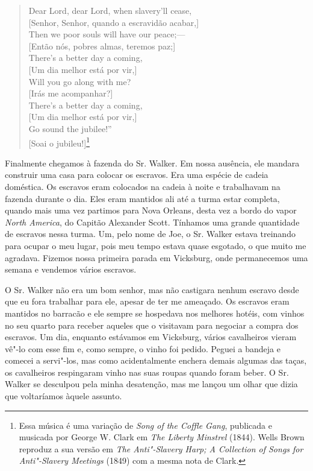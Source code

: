 \begin{verse}
Dear Lord, dear Lord, when slavery'll cease,\\
{[}Senhor, Senhor, quando a escravidão acabar,{]}\\
Then we poor souls will have our peace;---\\
{[}Então nós, pobres almas, teremos paz;{]}\\
There's a better day a coming,\\
{[}Um dia melhor está por vir,{]}\\
Will you go along with me?\\
{[}Irás me acompanhar?{]}\\
There's a better day a coming,\\
{[}Um dia melhor está por vir,{]}\\
Go sound the jubilee!''\\
{[}Soai o jubileu!{]}\footnote{Essa música é uma
  variação de \emph{Song of the Coffle Gang}, publicada e musicada por
  George W. Clark em \emph{The Liberty Minstrel} (1844). Wells Brown
  reproduz a sua versão em \emph{The Anti"-Slavery Harp; A Collection of
  Songs for Anti"-Slavery Meetings} (1849) com a mesma nota de Clark.}
\end{verse}

Finalmente chegamos à fazenda do Sr. Walker. Em nossa ausência, ele
mandara construir uma casa para colocar os escravos. Era uma espécie de
cadeia doméstica. Os escravos eram colocados na cadeia à noite e
trabalhavam na fazenda durante o dia. Eles eram mantidos ali até a turma
estar completa, quando mais uma vez partimos para Nova Orleans, desta
vez a bordo do vapor \emph{North America}, do Capitão Alexander Scott.
Tínhamos uma grande quantidade de escravos nessa turma. Um, pelo nome de
Joe, o Sr. Walker estava treinando para ocupar o meu lugar, pois meu
tempo estava quase esgotado, o que muito me agradava. Fizemos nossa
primeira parada em Vicksburg, onde permanecemos uma semana e vendemos
vários escravos.

O Sr. Walker não era um bom senhor, mas não castigara nenhum escravo
desde que eu fora trabalhar para ele, apesar de ter me ameaçado. Os
escravos eram mantidos no barracão e ele sempre se hospedava nos
melhores hotéis, com vinhos no seu quarto para receber aqueles que o
visitavam para negociar a compra dos escravos. Um dia, enquanto
estávamos em Vicksburg, vários cavalheiros vieram vê"-lo com esse fim e,
como sempre, o vinho foi pedido. Peguei a bandeja e comecei a servi"-los,
mas como acidentalmente enchera demais algumas das taças, os cavalheiros
respingaram vinho nas suas roupas quando foram beber. O Sr. Walker se
desculpou pela minha desatenção, mas me lançou um olhar que dizia que
voltaríamos àquele assunto.

